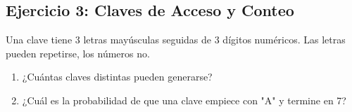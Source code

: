 \documentclass{article}
\begin{document}
	\subsection{Ejercicio 3: Claves de Acceso y Conteo}
	Una clave tiene 3 letras mayúsculas seguidas de 3 dígitos numéricos. Las letras pueden repetirse, los números no.
	\begin{enumerate}
		\item ¿Cuántas claves distintas pueden generarse?
		\item ¿Cuál es la probabilidad de que una clave empiece con "A" y termine en 7?
	\end{enumerate}
	
\end{document}
